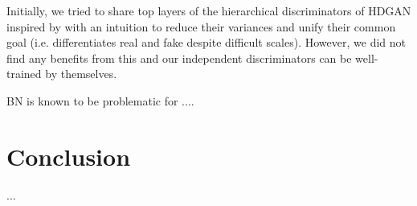 \documentclass[10pt,twocolumn,letterpaper]{article}
\begin{document}
Initially, we tried to share top layers of the hierarchical discriminators of HDGAN inspired by \cite{liu2017unsupervised} with an intuition to reduce their variances and unify their common goal (i.e. differentiates real and fake despite difficult scales). However, we did not find any benefits from this and our independent discriminators can be well-trained by themselves. 

BN is known to be problematic for .... 





\section{Conclusion}
...

{\small


}
\end{document}
